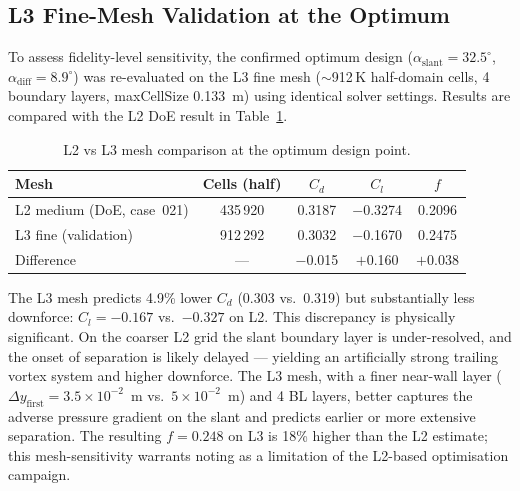 \subsection{L3 Fine-Mesh Validation at the Optimum}
\label{sec:l3_validation}

To assess fidelity-level sensitivity, the confirmed optimum design ($\alpha_\mathrm{slant}=32.5^\circ$, $\alpha_\mathrm{diff}=8.9^\circ$) was re-evaluated on the L3 fine mesh ($\sim$912\,K half-domain cells, 4 boundary layers, maxCellSize 0.133~m) using identical solver settings. Results are compared with the L2 DoE result in Table~\ref{tab:l3_validation}.

\begin{table}[h]
  \centering
  \caption{L2 vs L3 mesh comparison at the optimum design point.}
  \label{tab:l3_validation}
  \begin{tabular}{lcccc}
    \toprule
    Mesh & Cells (half) & $C_d$ & $C_l$ & $f$ \\
    \midrule
    L2 medium (DoE, case~021) & 435\,920  & 0.3187 & $-$0.3274 & 0.2096 \\
    L3 fine   (validation)    & 912\,292  & 0.3032 & $-$0.1670 & 0.2475 \\
    \midrule
    Difference                & ---        & $-$0.015 & $+$0.160  & $+$0.038 \\
    \bottomrule
  \end{tabular}
\end{table}

The L3 mesh predicts 4.9\% lower $C_d$ (0.303 vs.\ 0.319) but substantially less downforce: $C_l = -0.167$ vs.\ $-0.327$ on L2. This discrepancy is physically significant. On the coarser L2 grid the slant boundary layer is under-resolved, and the onset of separation is likely delayed — yielding an artificially strong trailing vortex system and higher downforce. The L3 mesh, with a finer near-wall layer ($\Delta y_\mathrm{first} = 3.5\times10^{-2}$~m vs.\ $5\times10^{-2}$~m) and 4 BL layers, better captures the adverse pressure gradient on the slant and predicts earlier or more extensive separation. The resulting $f = 0.248$ on L3 is 18\% higher than the L2 estimate; this mesh-sensitivity warrants noting as a limitation of the L2-based optimisation campaign.

